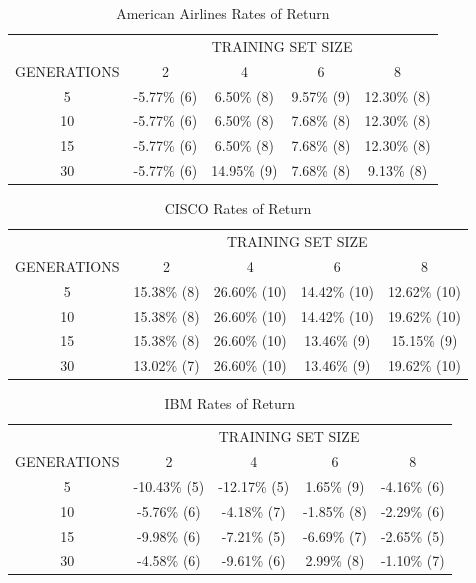 \documentclass[12pt,journal,compsoc]{IEEEtran}
\begin{document}
\begin{table}
\caption{{American Airlines Rates of Return}}
\label{aa-ror-table}
    \begin{tabular}{ c c c c c }
         & \multicolumn{4}{c}{TRAINING SET SIZE} \\ 
        GENERATIONS & 2           & 4           & 6          & 8           \\ 
        5           & -5.77\% (6) & 6.50\% (8)  & 9.57\% (9) & 12.30\% (8) \\ 
        10          & -5.77\% (6) & 6.50\% (8)  & 7.68\% (8) & 12.30\% (8) \\ 
        15          & -5.77\% (6) & 6.50\% (8)  & 7.68\% (8) & 12.30\% (8) \\ 
        30          & -5.77\% (6) & 14.95\% (9) & 7.68\% (8) & 9.13\% (8)  \\ 
    \end{tabular} 
\end{table}
  
\begin{table}
\caption{{CISCO Rates of Return}}
\label{csco-ror-table}
    \begin{tabular}{ c c c c c }
         & \multicolumn{4}{c}{TRAINING SET SIZE} \\ 
        GENERATIONS & 2           & 4           & 6             & 8           \\ 
        5           & 15.38\% (8) & 26.60\% (10) & 14.42\% (10) & 12.62\% (10) \\ 
        10          & 15.38\% (8) & 26.60\% (10) & 14.42\% (10) & 19.62\% (10) \\ 
        15          & 15.38\% (8) & 26.60\% (10) & 13.46\% (9)  & 15.15\% (9) \\ 
        30          & 13.02\% (7) & 26.60\% (10) & 13.46\% (9)  & 19.62\% (10)  \\ 
    \end{tabular} 
\end{table}

\begin{table}
\caption{{IBM Rates of Return}}
\label{ibm-ror-table}
    \begin{tabular}{ c c c c c }
         & \multicolumn{4}{c}{TRAINING SET SIZE} \\ 
        GENERATIONS & 2            & 4           & 6             & 8           \\ 
        5           & -10.43\% (5) & -12.17\% (5) & 1.65\% (9) & -4.16\% (6) \\ 
        10          & -5.76\% (6)  & -4.18\% (7) & -1.85\% (8) & -2.29\% (6) \\ 
        15          & -9.98\% (6)  & -7.21\% (5) & -6.69\% (7)  & -2.65\% (5) \\ 
        30          & -4.58\% (6)  & -9.61\% (6) & 2.99\% (8)  & -1.10\% (7)  \\ 
    \end{tabular} 
\end{table}
\end{document}
